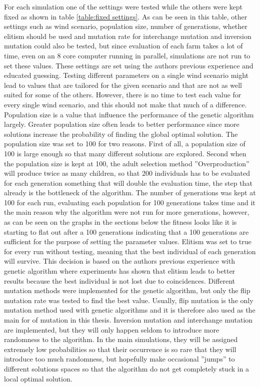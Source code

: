 \noindent For each simulation one of the settings were tested while the others were kept fixed as shown in table \ref{table:fixed settings}. As can be seen in this table, other settings such as wind scenario, population size, number of generations, whether elitism should be used and mutation rate for interchange mutation and inversion mutation could also be tested, but since evaluation of each farm takes a lot of time, even on an 8 core computer running in parallel, simulations are not run to set these values. These settings are set using the authors previous experience and educated guessing. Testing different parameters on a single wind scenario might lead to values that are tailored for the given scenario and that are not as well suited for some of the others. However, there is no time to test each value for every single wind scenario, and this should not make that much of a difference. Population size is a value that influence the performance of the genetic algorithm largely. Greater population size often leads to better performance since more solutions increase the probability of finding the global optimal solution. The population size was set to 100 for two reasons. First of all, a population size of 100 is large enough so that many different solutions are explored. Second when the population size is kept at 100, the adult selection method ''Overproduction'' will produce twice as many children, so that 200 individuals has to be evaluated for each generation something that will double the evaluation time, the step that already is the bottleneck of the algorithm. The number of generations was kept at 100 for each run, evaluating each population for 100 generations takes time and it the main reason why the algorithm were not run for more generations, however, as can be seen on the graphs in the sections below the fitness looks like it is starting to flat out after a 100 generations indicating that a 100 generations are sufficient for the purpose of setting the parameter values. Elitism was set to true for every run without testing, meaning that the best individual of each generation will survive. This decision is based on the authors previous experience with genetic algorithm where experiments has shown that elitism leads to better results because the best individual is not lost due to coincidences. Different mutation methods were implemented for the genetic algorithm, but only the flip mutation rate was tested to find the best value. Usually, flip mutation is the only mutation method used with genetic algorithms and it is therefore also used as the main for of mutation in this thesis. Inversion mutation and interchange mutation are implemented, but they will only happen seldom to introduce more randomness to the algorithm. In the main simulations, they will be assigned extremely low probabilities so that their occurrence is so rare that they will introduce too much randomness, but hopefully make occasional ''jumps'' to different solutions spaces so that the algorithm do not get completely stuck in a local optimal solution. 


